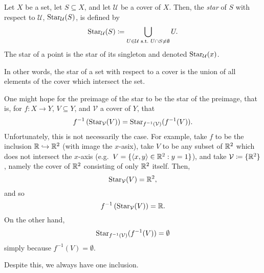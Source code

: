 \begin{dfn}[Star]\label{Star}
Let $X$ be a set, let $S\subseteq X$, and let $\mathcal{U}$ be a cover of $X$.  Then, the \emph{star} of $S$ with respect to $\mathcal{U}$, $\operatorname{Star} _{\mathcal{U}}(S)$, is defined by
\begin{equation}
\operatorname{Star} _{\mathcal{U}}(S)\coloneqq \bigcup _{U\in \mathcal{U}\text{ s.t.~} U\cap S\neq \emptyset}U.
\end{equation}
The star of a point is the star of its singleton and denoted $\operatorname{Star} _{\mathcal{U}}(x)$.
\begin{rmk}
In other words, the star of a set with respect to a cover is the union of all elements of the cover which intersect the set.
\end{rmk}
\end{dfn}
\begin{exm}
One might hope for the preimage of the star to be the star of the preimage, that is, for $f:X\rightarrow Y$, $V\subseteq Y$, and $\mathcal{V}$ a cover of $Y$, that
\begin{equation}
f^{-1}\left( \operatorname{Star} _{\mathcal{V}}(V)\right) =\operatorname{Star} _{f^{-1}(\mathcal{V})}(f^{-1}(V)).
\end{equation}
Unfortunately, this is not necessarily the case.  For example, take $f$ to be the inclusion $\mathbb{R} \hookrightarrow \mathbb{R} ^2$ (with image the $x$-asix), take $V$ to be any subset of $\mathbb{R} ^2$ which does not intersect the $x$-axis (e.g.~$V=\{ \langle x,y\rangle\in \mathbb{R} ^2:y=1\}$), and take $\mathcal{V}\coloneqq \{ \mathbb{R} ^2\}$, namely the cover of $\mathbb{R} ^2$ consisting of only $\mathbb{R} ^2$ itself.  Then,
\begin{equation}
\operatorname{Star} _{\mathcal{V}}(V)=\mathbb{R} ^2,
\end{equation}
and so
\begin{equation}
f^{-1}\left( \operatorname{Star} _{\mathcal{V}}(V)\right) =\mathbb{R} .
\end{equation}
On the other hand,
\begin{equation}
\operatorname{Star} _{f^{-1}(\mathcal{V})}(f^{-1}(V))=\emptyset 
\end{equation}
simply because $f^{-1}(V)=\emptyset$.
\end{exm}
Despite this, we always have one inclusion.
